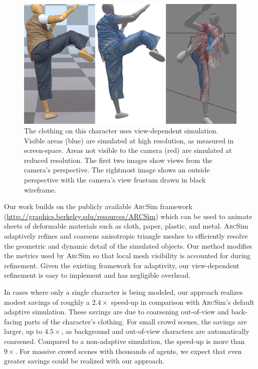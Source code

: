 \documentclass[10pt,journal,compsoc,twoside]{TexInputs/IEEEtran}
\newcommand{\rahul}[1]{\textcolor{blue}{(#1 ---Rahul)}}
\newcommand{\arcsim}{\textsc{Arc}Sim\xspace}
\begin{document}
\begin{figure}[t]
	\vspace*{-.05in}
    \centering
    \includegraphics[width=1.0\columnwidth]{karate/karate}
	\vspace*{-.2in}
    \caption{The clothing on this character uses view-dependent simulation.  
	Visible areas (blue) are simulated at high resolution, as measured in screen-space.  
	Areas not visible to the camera (red) are simulated at reduced resolution.
    The first two images show views from the camera's perspective.  The rightmost image 
	shows an outside perspective with the camera's view frustum drawn in black wireframe. 
}
    \label{fig:teaser}
	\vspace*{-.20in}
\end{figure}

Our work builds on the publicly available \arcsim
framework (\url{http://graphics.berkeley.edu/resources/ARCSim}) which
can be used to animate sheets of deformable materials such as cloth, paper,
plastic, and metal. \arcsim adaptively refines and coarsens anisotropic triangle meshes to
efficiently resolve the geometric and dynamic detail of the simulated objects.
Our method modifies the metrics used by \arcsim so that local mesh visibility
is accounted for during refinement. Given the existing framework for adaptivity,
our view-dependent refinement is easy to implement and has negligible overhead.

In cases where only a single character is being modeled, our approach realizes modest savings of roughly a $2.4\times$ speed-up in comparison with \arcsim's
default adaptive simulation. These savings are due to coarsening out-of-view and back-facing parts of the character's clothing. For small crowd
scenes, the savings are larger, up to $4.5\times$, as background and out-of-view characters are automatically coarsened. Compared to a non-adaptive
simulation, the speed-up is more than $9\times$. For massive crowd scenes with thousands of agents, we expect that even greater savings could be
realized with our approach.
\end{document}
